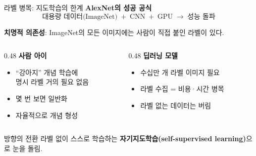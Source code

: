 \documentclass[aspectratio=169,10pt]{beamer}
\begin{document}
\begin{frame}{라벨 병목: 지도학습의 한계}
\textbf{AlexNet의 성공 공식}
\[
\text{대용량 데이터(ImageNet)} \;+\; \text{CNN} \;+\; \text{GPU} \;\to\; \text{성능 돌파}
\]

\vspace{0.3em}
\textbf{치명적 의존성}: ImageNet의 모든 이미지에는 \alert{사람이 직접 붙인 라벨}이 있다.

\vspace{0.5em}
\begin{columns}[T]
\begin{column}{0.48\textwidth}
\textbf{사람 아이}
\begin{itemize}
  \item ``강아지'' 개념 학습에 \\명시 라벨 \alert{거의 필요 없음}
  \item 몇 번 보면 일반화
  \item 자율적으로 개념 형성
\end{itemize}
\end{column}
\begin{column}{0.48\textwidth}
\textbf{딥러닝 모델}
\begin{itemize}
  \item 수십만 개 라벨 이미지 필요
  \item 라벨 수집 = 비용·시간 병목
  \item 라벨 없는 데이터는 버림
\end{itemize}
\end{column}
\end{columns}

\vspace{0.8em}
\begin{alertblock}{방향의 전환}
라벨 없이 스스로 학습하는 \textbf{자기지도학습(self-supervised learning)}으로 눈을 돌림.
\end{alertblock}
\end{frame}
\end{document}
